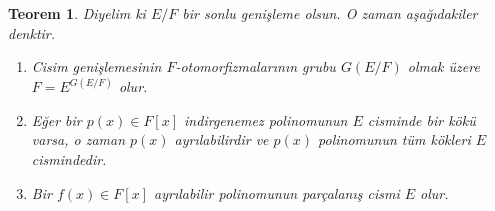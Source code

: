 \documentclass[draft]{article}
\newtheorem{thm}{Teorem}[section]
\theoremstyle{definition}
\theoremstyle{remark}
\begin{document}
    		\begin{thm}
    		    Diyelim ki $E/F$ bir sonlu genişleme olsun. O zaman aşağıdakiler denktir.
    		    \begin{enumerate}
    				\renewcommand{\labelenumi}{(\roman{enumi})}
    				\item Cisim genişlemesinin $F$-otomorfizmalarının grubu $G(E/F)$ olmak üzere $F = E^{G(E/F)}$ olur.
    				\item Eğer bir $p(x) \in F[x]$ indirgenemez polinomunun $E$ cisminde bir kökü varsa, o zaman $p(x)$ ayrılabilirdir ve $p(x)$ polinomunun tüm kökleri $E$ cismindedir.
    				\item Bir $f(x) \in F[x]$ ayrılabilir polinomunun parçalanış cismi $E$ olur.
    			\end{enumerate}
    		\end{thm}
    		
\end{document}

